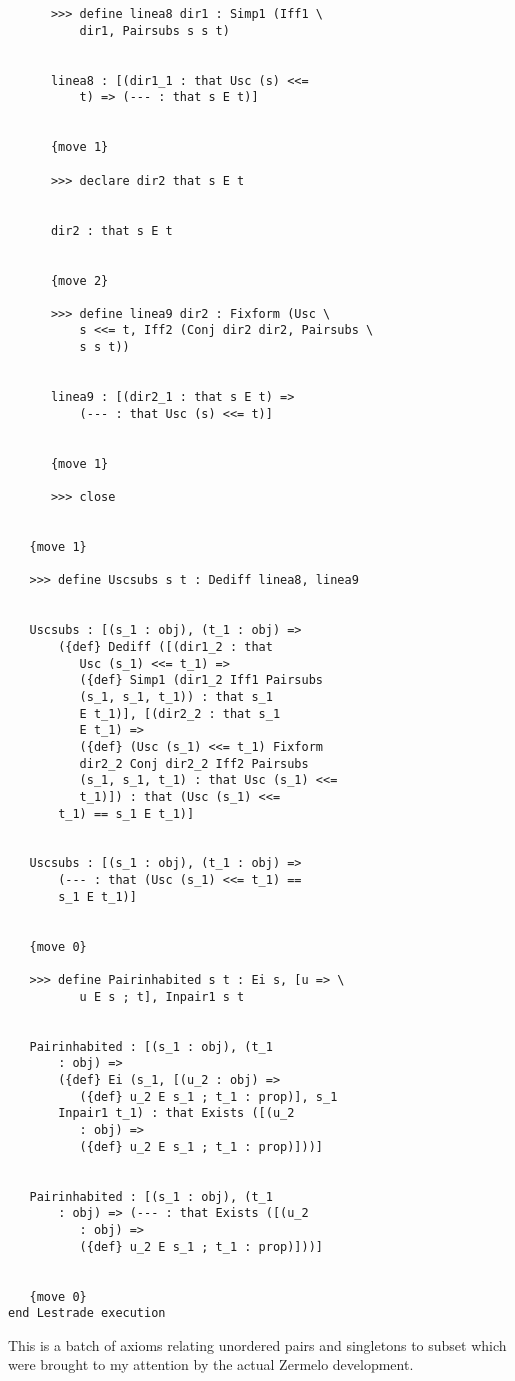 \documentclass[12pt]{article}
\begin{document}
\begin{verbatim}
      >>> define linea8 dir1 : Simp1 (Iff1 \
          dir1, Pairsubs s s t)


      linea8 : [(dir1_1 : that Usc (s) <<= 
          t) => (--- : that s E t)]


      {move 1}

      >>> declare dir2 that s E t


      dir2 : that s E t


      {move 2}

      >>> define linea9 dir2 : Fixform (Usc \
          s <<= t, Iff2 (Conj dir2 dir2, Pairsubs \
          s s t))


      linea9 : [(dir2_1 : that s E t) => 
          (--- : that Usc (s) <<= t)]


      {move 1}

      >>> close


   {move 1}

   >>> define Uscsubs s t : Dediff linea8, linea9


   Uscsubs : [(s_1 : obj), (t_1 : obj) => 
       ({def} Dediff ([(dir1_2 : that 
          Usc (s_1) <<= t_1) => 
          ({def} Simp1 (dir1_2 Iff1 Pairsubs 
          (s_1, s_1, t_1)) : that s_1 
          E t_1)], [(dir2_2 : that s_1 
          E t_1) => 
          ({def} (Usc (s_1) <<= t_1) Fixform 
          dir2_2 Conj dir2_2 Iff2 Pairsubs 
          (s_1, s_1, t_1) : that Usc (s_1) <<= 
          t_1)]) : that (Usc (s_1) <<= 
       t_1) == s_1 E t_1)]


   Uscsubs : [(s_1 : obj), (t_1 : obj) => 
       (--- : that (Usc (s_1) <<= t_1) == 
       s_1 E t_1)]


   {move 0}

   >>> define Pairinhabited s t : Ei s, [u => \
          u E s ; t], Inpair1 s t


   Pairinhabited : [(s_1 : obj), (t_1 
       : obj) => 
       ({def} Ei (s_1, [(u_2 : obj) => 
          ({def} u_2 E s_1 ; t_1 : prop)], s_1 
       Inpair1 t_1) : that Exists ([(u_2 
          : obj) => 
          ({def} u_2 E s_1 ; t_1 : prop)]))]


   Pairinhabited : [(s_1 : obj), (t_1 
       : obj) => (--- : that Exists ([(u_2 
          : obj) => 
          ({def} u_2 E s_1 ; t_1 : prop)]))]


   {move 0}
end Lestrade execution
\end{verbatim}

This is a batch of axioms relating unordered pairs and singletons to subset which were brought to my attention by the actual Zermelo development.
\end{document}
